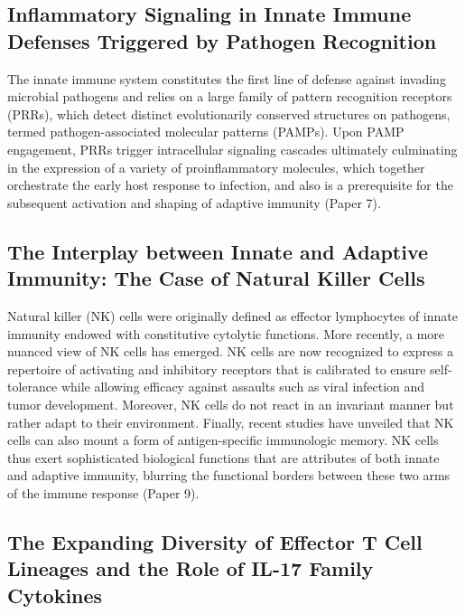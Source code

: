\documentclass{article}
\begin{document}
\subsection{Inflammatory Signaling in Innate Immune Defenses Triggered by Pathogen Recognition}

The innate immune system constitutes the first line of defense against invading microbial pathogens and relies on a large family of pattern recognition receptors (PRRs), which detect distinct evolutionarily conserved structures on pathogens, termed pathogen-associated molecular patterns (PAMPs). Upon PAMP engagement, PRRs trigger intracellular signaling cascades ultimately culminating in the expression of a variety of proinflammatory molecules, which together orchestrate the early host response to infection, and also is a prerequisite for the subsequent activation and shaping of adaptive immunity (Paper 7).

\subsection{The Interplay between Innate and Adaptive Immunity: The Case of Natural Killer Cells}

Natural killer (NK) cells were originally defined as effector lymphocytes of innate immunity endowed with constitutive cytolytic functions. More recently, a more nuanced view of NK cells has emerged. NK cells are now recognized to express a repertoire of activating and inhibitory receptors that is calibrated to ensure self-tolerance while allowing efficacy against assaults such as viral infection and tumor development. Moreover, NK cells do not react in an invariant manner but rather adapt to their environment. Finally, recent studies have unveiled that NK cells can also mount a form of antigen-specific immunologic memory. NK cells thus exert sophisticated biological functions that are attributes of both innate and adaptive immunity, blurring the functional borders between these two arms of the immune response (Paper 9).

\subsection{The Expanding Diversity of Effector T Cell Lineages and the Role of IL-17 Family Cytokines}
\end{document}
